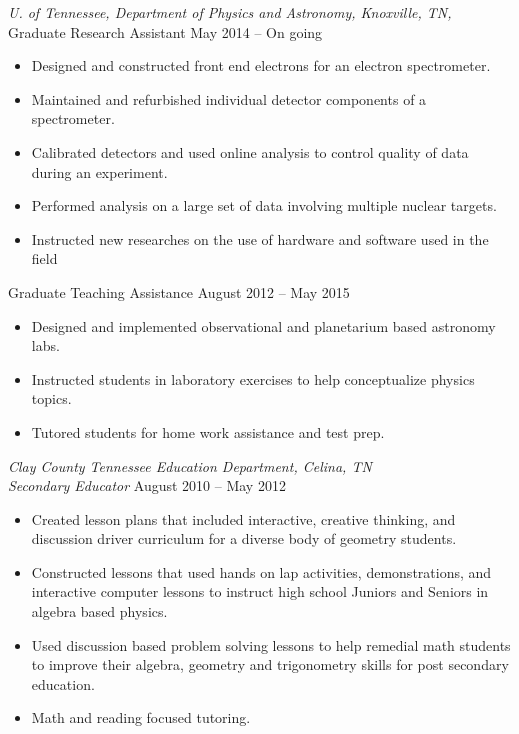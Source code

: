 \documentclass[12pt]{res} %
\begin{document}
\begin{resume}
{\sl U. of Tennessee, Department of Physics and Astronomy,  Knoxville, TN,  } \\[2pt]
\vspace{-1pt} %
Graduate Research Assistant \hfill May 2014 -- On going 
\begin{itemize} \itemsep -2pt %
	\item Designed and constructed front end electrons for an electron spectrometer.
	\item Maintained and refurbished individual detector components of a spectrometer.
	\item Calibrated detectors and used online analysis to control quality of data during an experiment. 
	\item Performed analysis on a large set of data involving multiple nuclear targets. 
	\item Instructed new researches on the use of hardware and software used in the field
	
\end{itemize}
\vspace{-6pt} %
Graduate Teaching Assistance  \hfill August 2012 -- May 2015 
\begin{itemize} \itemsep -2pt %
	\item Designed and implemented observational and planetarium based astronomy labs. 
	\item Instructed students in laboratory exercises to help conceptualize physics topics.
	\item Tutored students for home work assistance and test prep.
\end{itemize} 

{\sl Clay County Tennessee Education Department, Celina, TN } \\[2pt]
{\sl Secondary Educator} \hfill August 2010 -- May 2012 \\
\vspace{-7pt} %
\begin{itemize} \itemsep -2pt %
\item Created lesson plans that included interactive, creative thinking, and discussion driver curriculum for a diverse body of geometry students.
\item Constructed lessons that used hands on lap activities, demonstrations, and interactive computer lessons to instruct high school Juniors and Seniors in algebra based physics. 
\item Used discussion based problem solving lessons to help remedial math students to improve their algebra, geometry and trigonometry skills for post secondary education. 
\item Math and reading focused tutoring. 
\end{itemize}


\end{resume}
\end{document}
